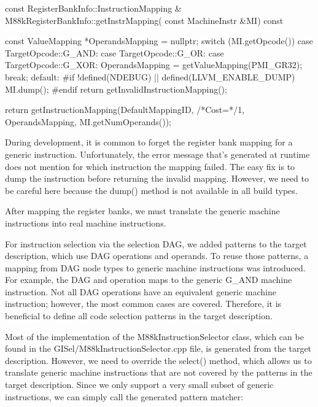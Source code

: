 \begin{cpp}
const RegisterBankInfo::InstructionMapping &
M88kRegisterBankInfo::getInstrMapping(
        const MachineInstr &MI) const {
    const ValueMapping *OperandsMapping = nullptr;
    switch (MI.getOpcode()) {
    case TargetOpcode::G_AND:
    case TargetOpcode::G_OR:
    case TargetOpcode::G_XOR:
        OperandsMapping = getValueMapping(PMI_GR32);
        break;
    default:
#if !defined(NDEBUG) || defined(LLVM_ENABLE_DUMP)
        MI.dump();
#endif
        return getInvalidInstructionMapping();
    }

    return getInstructionMapping(DefaultMappingID, /*Cost=*/1,
                                 OperandsMapping,
                                 MI.getNumOperands());
}
\end{cpp}

During development, it is common to forget the register bank mapping for a generic instruction.
Unfortunately, the error message that’s generated at runtime does not mention for which instruction the mapping failed. The easy fix is to dump the instruction before returning the invalid mapping.
However, we need to be careful here because the dump() method is not available in all build types.

After mapping the register banks, we must translate the generic machine instructions into real machine instructions.


For instruction selection via the selection DAG, we added patterns to the target description, which use DAG operations and operands. To reuse those patterns, a mapping from DAG node types to generic machine instructions was introduced. For example, the DAG and operation maps to the generic G\_AND machine instruction. Not all DAG operations have an equivalent generic machine instruction; however, the most common cases are covered. Therefore, it is beneficial to define all code selection patterns in the target description.

Most of the implementation of the M88kInstructionSelector class, which can be found in the GISel/M88kInstructionSelector.cpp file, is generated from the target description. However, we need to override the select() method, which allows us to translate generic machine instructions that are not covered by the patterns in the target description. Since we only support a very small subset of generic instructions, we can simply call the generated pattern matcher:

